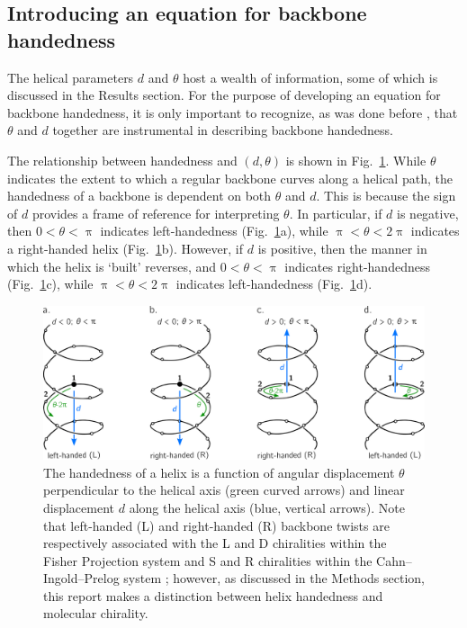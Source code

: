 \documentclass[fleqn,10pt,lineno]{wlpeerj} %
\newcommand{\n}[1]{{\color{black}#1}} %
\newcommand{\Fig}[1]{Fig.~\ref{#1}}
\begin{document}
\subsection*{Introducing an equation for backbone handedness} 
The helical parameters $d$ and $\theta$ host a wealth of information, some of which is discussed in the Results section. For the purpose of developing an equation for backbone handedness, it is only important to recognize, as was done before \citep{Zacharias2013}, that $\theta$ and $d$ together are instrumental in describing  backbone handedness. %

The relationship between \n{handedness and $(d,\theta)$} is shown in \Fig{fig:helix_handedness}. While $\theta$ indicates the extent to which a regular backbone curves along a helical path, the handedness of a backbone is dependent on both $\theta$ and $d$. This is because the sign of $d$ provides a frame of reference for interpreting $\theta$. In particular, if $d$ is negative, then $0 < \theta < \uppi$ indicates left-handedness (\Fig{fig:helix_handedness}a), while $\uppi < \theta < 2\uppi$ indicates a right-handed helix (\Fig{fig:helix_handedness}b). However, if $d$ is positive, then the manner in which the helix is `built' reverses, and $0 < \theta < \uppi$ indicates right-handedness (\Fig{fig:helix_handedness}c), while $\uppi < \theta < 2\uppi$ indicates left-handedness (\Fig{fig:helix_handedness}d).

\begin{figure}[t!]
\centering
\includegraphics[width=0.95\linewidth]{./figures/helix_handedness.pdf}
\caption{\label{fig:helix_handedness} The handedness of a helix is a function of angular displacement \n{$\theta$} perpendicular to the helical axis (green curved arrows) and linear displacement \n{$d$} along the helical axis (blue, vertical arrows). Note that left-handed \n{(L)} and right-handed \n{(R)}  backbone twists are respectively associated with the L and D chiralities within the Fisher Projection system and S and R chiralities within the Cahn--Ingold--Prelog system \citep{Cross2013}; however, as discussed in the Methods section, this report makes a distinction between helix handedness and molecular chirality.
}
\end{figure}
\end{document}
